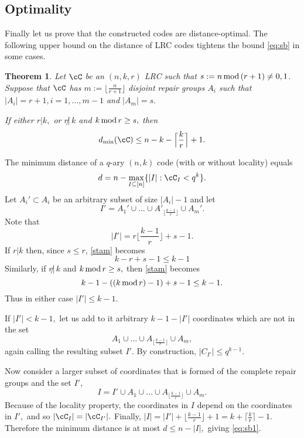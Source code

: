 \documentclass{IEEEtran}
\newtheorem{theorem}{Theorem}[section]
\newcounter{construction}[section]
\newcommand{\Mod}[1]{\,\textup{mod}\,#1}
\newcommand\remove[1]{}
\begin{document}
\subsection{Optimality}
Finally let us prove that the constructed codes are distance-optimal.
The following upper bound on the distance of LRC codes tightens the bound \eqref{eq:sb} in some cases.
\begin{theorem}\label{thm:sb1}
Let $\cC$ be an $(n,k,r)$ LRC such that $s:=n\Mod (r+1)\neq 0,1$. Suppose that $\cC$ has 
$m:=\lfloor \frac{n}{r+1}\rfloor$ disjoint repair groups $A_i$ such that $|A_i|=r+1,i=1,\dots,m-1$ and $|A_m|=s.$

If either $r|k,$ or $r \!\!\not|\, k$ and $k\Mod r\geq s,$ then 
   \begin{equation}\label{eq:sb1}
   d_{\text{min}}(\cC)\leq n-k-\Big\lceil \frac{k}{r} \Big\rceil +1.
   \end{equation}
\end{theorem}

\begin{IEEEproof}
The minimum distance of a $q$-ary $(n,k)$ code (with or without locality) equals
  $$
  d=n- \max_{I\subseteq [n]}\{|I|:\cC_I<q^k\}.
  $$
Let $A_i'\subset A_i$ be an arbitrary subset of size $|A_i|-1$ and let  
   $$
   I'=A_1'\cup\dots\cup A'_{\lfloor \frac{k-1}{r} \rfloor}\cup A_m'.
   $$
Note that 
    \begin{equation}
|I'|=r \Big\lfloor \frac{k-1}{r} \Big\rfloor +s-1.
\label{stam}
   \end{equation}
If $r|k$ then, since $s\leq r$, \eqref{stam} becomes 
   $$
   k-r+s-1\leq k-1
   $$ 
Similarly, if $r\!\!\not|\,k$ and $k\Mod r\geq s,$ then \eqref{stam} becomes
   $$
   k-1-((k\Mod r)-1)+s-1\leq k-1.
   $$
Thus in either case $|I'|\le k-1$. 

If $|I'|<k-1,$ let us add to it arbitrary $k-1-|I'|$ coordinates which are not in the set 
$$A_1\cup\dots\cup A_{\lfloor \frac{k-1}{r} \rfloor}\cup A_m,$$ again calling the resulting subset $I'.$
By construction, $|C_{I'}|\leq q^{k-1}.$ 

Now consider a larger subset of coordinates that is formed of the complete repair groups and the set $I'$,
  $$
  I=I'\cup A_1\cup\dots\cup A_{\lfloor \frac{k-1}{r} \rfloor}\cup A_m.
  $$
Because of the locality property, the coordinates in $I$ depend on the coordinates in 
$I',$ and so $|\cC_I|=|\cC_{I'}|.$
 Finally, $|I|=|I'|+\lfloor \frac{k-1}{r} \rfloor +1=k+\lceil \frac{k}{r} \rceil -1$. 
Therefore the minimum distance is at most 
$d\leq n-|I|,$ giving \eqref{eq:sb1}.
\remove{comment: the proof is not fully complete, because we need to argue using the upper bound on $k$ that there exists enough coordinates that we can add to the set $I'$ in order to make it of size $k-1$. But I think we can sweep it under the rug.}
\end{IEEEproof}
\end{document}
